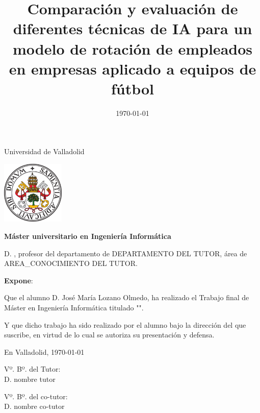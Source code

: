 \documentclass[a4paper,12pt,oneside,oldfontcommands]{memoir}
\title{Comparación y evaluación de diferentes técnicas de IA para un modelo de rotación de empleados en empresas aplicado a equipos de fútbol}
\author{\nombre}
\date{\today}
\newcommand{\nombre}[0]{José María Lozano Olmedo} %
\newcommand{\depto}[0]{DEPARTAMENTO DEL TUTOR}
\newcommand{\areac}[0]{AREA\_CONOCIMIENTO DEL TUTOR}
\begin{document}
\maketitle


\newpage\null\thispagestyle{empty}\newpage


\thispagestyle{empty}


\noindent
\begin{center}%
	{\noindent\Huge Universidad de Valladolid}\vspace{.5cm}%
	
\begin{center}%
	\includegraphics[height=3cm]{img/escudoUVA} \hspace{1cm}
\end{center}%

	{\noindent\Large \textbf{Máster universitario en Ingeniería Informática}}\vspace{.5cm}%
\end{center}%



\noindent D. \makeatletter\@tutor\makeatother, profesor del departamento de \depto, área de \areac.

\noindent \textbf{Expone}:

\noindent Que el alumno D. \nombre, %
ha realizado el Trabajo final de Máster en Ingeniería Informática titulado "\makeatletter\textsc{\@title{}}\makeatother". 

\noindent Y que dicho trabajo ha sido realizado por el alumno bajo la dirección del que suscribe, en virtud de lo cual se autoriza su presentación y defensa.

\begin{center} %
En Valladolid, {\large \today}
\end{center}

\vfill\vfill\vfill



\begin{minipage}{0.45\textwidth}
\begin{flushleft} %
Vº. Bº. del Tutor:\\[2cm]
D. nombre tutor
\end{flushleft}
\end{minipage}
\hfill
\begin{minipage}{0.45\textwidth}
\begin{flushleft} %
Vº. Bº. del co-tutor:\\[2cm]
D. nombre co-tutor
\end{flushleft}
\end{minipage}
\hfill
\end{document}
